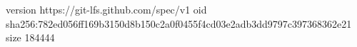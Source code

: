 version https://git-lfs.github.com/spec/v1
oid sha256:782ed056ff169b3150d8b150c2a0f0455f4cd03e2adb3dd9797c397368362e21
size 184444
